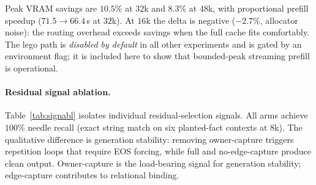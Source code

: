 Peak VRAM savings are $10.5\%$ at $32$k and $8.3\%$ at $48$k, with proportional prefill speedup
($71.5 \to 66.4$\,s at $32$k). At $16$k the delta is negative ($-2.7\%$, allocator noise): the
routing overhead exceeds savings when the full cache fits comfortably. The lego path is
\emph{disabled by default} in all other experiments and is gated by an environment flag;
it is included here to show that bounded-peak streaming prefill is operational.

\paragraph{Residual signal ablation.}
Table~\ref{tab:signabl} isolates individual residual-selection signals. All arms achieve $100\%$
needle recall (exact string match on six planted-fact contexts at $8$k). The qualitative
difference is generation stability: removing owner-capture triggers repetition loops that require
EOS forcing, while full \dkv{} and no-edge-capture produce clean output. Owner-capture is the
load-bearing signal for generation stability; edge-capture contributes to relational binding.

\begin{\tabenv}[t]
  \centering
  \caption{Residual-signal ablation (six planted-fact contexts, $8$k, compressed decode).
  Accuracy is exact-string recall. Qualitative column captures generation artifacts invisible
  in the binary accuracy metric.}
  \label{tab:signabl}
  \footnotesize
  
\end{\tabenv}


